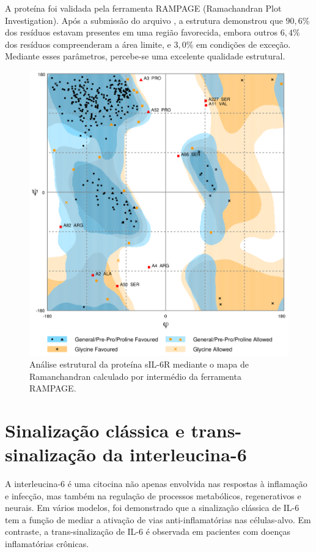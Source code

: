A proteína foi validada pela ferramenta RAMPAGE (Ramachandran Plot Investigation). Após a submissão do arquivo , a estrutura demonstrou que $90,6\%$ dos resíduos estavam presentes em uma região favorecida, embora outros $6,4\%$ dos resíduos compreenderam a área limite, e $3,0\%$ em condições de exceção. Mediante esses parâmetros, percebe-se uma excelente qualidade estrutural.

\begin{figure}[H]
\centering
\includegraphics[scale=0.6]{Figuras/ramachandran_1n26.png}
\caption{Análise estrutural da proteína sIL-6R mediante o mapa de Ramanchandran calculado por intermédio da ferramenta RAMPAGE. \cite{Ramanchandran2003}}
\end{figure}

\section{Sinalização clássica e trans-sinalização da interleucina-6}

A interleucina-6 é uma citocina não apenas envolvida nas respostas à inflamação e infecção, mas também na regulação de processos metabólicos, regenerativos e neurais. Em vários modelos, foi demonstrado que a sinalização clássica de IL-6 tem a função de mediar a ativação de vias anti-inflamatórias nas células-alvo. Em contraste, a trans-sinalização de IL-6 é observada em pacientes com doenças inflamatórias crônicas. \cite{Scheller2011}


